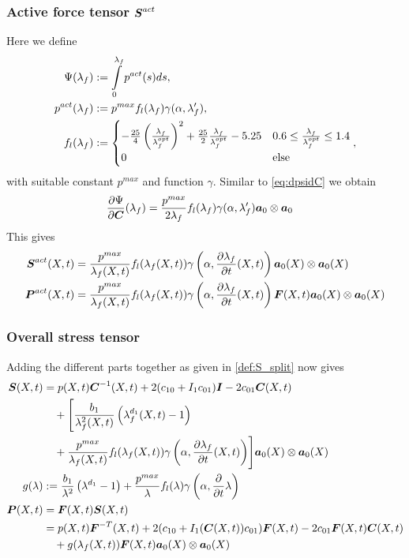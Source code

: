 \subsubsection{Active force tensor $\boldsymbol{S}^{act}$}
Here we define
\begin{align}
	\Psi(\lambda_f) &:= \int\limits_{0}^{\lambda_f} p^{act}(s)ds,\nonumber\\
	p^{act}(\lambda_f) &:= p^{max}f_l(\lambda_f)\gamma(\alpha,\lambda_f'),\nonumber\\
	f_l(\lambda_f) &:= \begin{cases}
		-\frac{25}{4}\left(\frac{\lambda_f}{\lambda_f^{opt}}\right)^2 + \frac{25}{2}\frac{\lambda_f}{\lambda_f^{opt}} - 5.25 & 0.6 \leq \frac{\lambda_f}{\lambda_f^{opt}} \leq 1.4\\ 
		0 & \text{else}
	\end{cases} \label{def:fl},
\end{align}
with suitable constant $p^{max}$ and function $\gamma$.
Similar to \eqref{eq:dpsidC} we obtain
\begin{align}
	\frac{\partial \Psi}{\partial \boldsymbol{C}}(\lambda_f) &= \frac{p^{max}}{2\lambda_f}f_l(\lambda_f)\gamma(\alpha,\lambda_f')\boldsymbol{a}_0\otimes\boldsymbol{a}_0
\end{align}
This gives
\begin{align}
	\boldsymbol{S}^{act}(X,t) &= \frac{p^{max}}{\lambda_f(X,t)}f_l(\lambda_f(X,t))\gamma\left(\alpha,\frac{\partial \lambda_f}{\partial t}(X,t)\right)\boldsymbol{a}_0(X)\otimes\boldsymbol{a}_0(X)\\
	\boldsymbol{P}^{act}(X,t) &= \frac{p^{max}}{\lambda_f(X,t)}f_l(\lambda_f(X,t))\gamma\left(\alpha,\frac{\partial \lambda_f}{\partial t}(X,t)\right)\boldsymbol{F}(X,t)\boldsymbol{a}_0(X)\otimes\boldsymbol{a}_0(X)
\end{align}

\subsubsection{Overall stress tensor}
Adding the different parts together as given in \eqref{def:S_split} now gives
\begin{align}
	\boldsymbol{S}(X,t) &= p(X,t)\boldsymbol{C}^{-1}(X,t) + 2(c_{10} + I_1c_{01})\boldsymbol{I} - 2c_{01}\boldsymbol{C}(X,t)\label{def:overallS}\\
			 &\quad+\Biggl[\frac{b_1}{\lambda_f^2(X,t)}\left(\lambda_f^{d_1}(X,t) - 1\right)\nonumber\\
			 &\quad+\frac{p^{max}}{\lambda_f(X,t)}f_l(\lambda_f(X,t))\gamma\left(\alpha,\frac{\partial \lambda_f}{\partial t}(X,t)\right)\Biggr]\boldsymbol{a}_0(X)\otimes\boldsymbol{a}_0(X)\nonumber\\
	g(\lambda)&:= \frac{b_1}{\lambda^2}\left(\lambda^{d_1} - 1\right)
		+\frac{p^{max}}{\lambda}f_l(\lambda)\gamma\left(\alpha,\frac{\partial }{\partial t}\lambda\right)\label{def:g}\\			 
	\boldsymbol{P}(X,t) &= \boldsymbol{F}(X,t)\boldsymbol{S}(X,t)\label{def:completeP}\\
			 &= p(X,t)\boldsymbol{F}^{-T}(X,t) + 2(c_{10} + I_1(\boldsymbol{C}(X,t))c_{01})\boldsymbol{F}(X,t) - 2c_{01}\boldsymbol{F}(X,t)\boldsymbol{C}(X,t)\nonumber\\
			 &\quad+g(\lambda_f(X,t))\boldsymbol{F}(X,t)\boldsymbol{a}_0(X)\otimes\boldsymbol{a}_0(X)\nonumber
\end{align}


